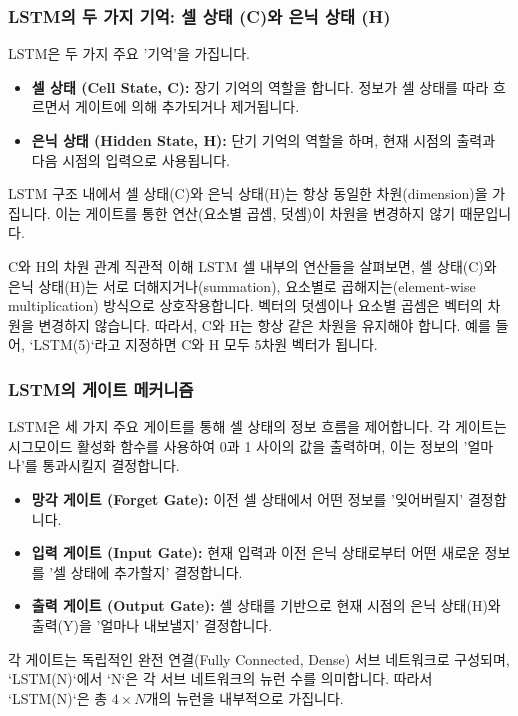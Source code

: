 \documentclass[11pt,a4paper]{article}
\begin{document}
\subsubsection{LSTM의 두 가지 기억: 셀 상태 (C)와 은닉 상태 (H)}
LSTM은 두 가지 주요 '기억'을 가집니다.
\begin{itemize}
    \item \textbf{셀 상태 (Cell State, C):} 장기 기억의 역할을 합니다. 정보가 셀 상태를 따라 흐르면서 게이트에 의해 추가되거나 제거됩니다.
    \item \textbf{은닉 상태 (Hidden State, H):} 단기 기억의 역할을 하며, 현재 시점의 출력과 다음 시점의 입력으로 사용됩니다.
\end{itemize}

\begin{tcolorbox}[title=\textbf{C와 H의 차원 관계}, colback=myblue!10!white, colframe=myblue!75!black]
LSTM 구조 내에서 셀 상태(C)와 은닉 상태(H)는 항상 동일한 차원(dimension)을 가집니다. 이는 게이트를 통한 연산(요소별 곱셈, 덧셈)이 차원을 변경하지 않기 때문입니다.
\end{tcolorbox}

\begin{examplebox}{C와 H의 차원 관계 직관적 이해}
LSTM 셀 내부의 연산들을 살펴보면, 셀 상태(C)와 은닉 상태(H)는 서로 더해지거나(summation), 요소별로 곱해지는(element-wise multiplication) 방식으로 상호작용합니다. 벡터의 덧셈이나 요소별 곱셈은 벡터의 차원을 변경하지 않습니다. 따라서, C와 H는 항상 같은 차원을 유지해야 합니다. 예를 들어, `LSTM(5)`라고 지정하면 C와 H 모두 5차원 벡터가 됩니다.
\end{examplebox}

\subsubsection{LSTM의 게이트 메커니즘}
LSTM은 세 가지 주요 게이트를 통해 셀 상태의 정보 흐름을 제어합니다. 각 게이트는 시그모이드 활성화 함수를 사용하여 0과 1 사이의 값을 출력하며, 이는 정보의 '얼마나'를 통과시킬지 결정합니다.
\begin{itemize}
    \item \textbf{망각 게이트 (Forget Gate):} 이전 셀 상태에서 어떤 정보를 '잊어버릴지' 결정합니다.
    \item \textbf{입력 게이트 (Input Gate):} 현재 입력과 이전 은닉 상태로부터 어떤 새로운 정보를 '셀 상태에 추가할지' 결정합니다.
    \item \textbf{출력 게이트 (Output Gate):} 셀 상태를 기반으로 현재 시점의 은닉 상태(H)와 출력(Y)을 '얼마나 내보낼지' 결정합니다.
\end{itemize}
각 게이트는 독립적인 완전 연결(Fully Connected, Dense) 서브 네트워크로 구성되며, `LSTM(N)`에서 `N`은 각 서브 네트워크의 뉴런 수를 의미합니다. 따라서 `LSTM(N)`은 총 $4 \times N$개의 뉴런을 내부적으로 가집니다.
\end{document}
